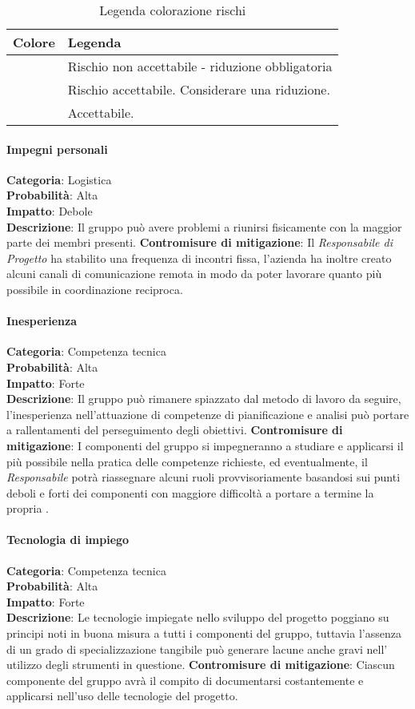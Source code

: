 \documentclass{scalatekids-article}
\begin{document}
\begin{table}[H]
  \centering
  \caption{Legenda colorazione rischi}
  \begin{tabular}{|c|l|}
    \hline \bf Colore & \bf Legenda \\
    \hline \cellcolor{red! 50} & Rischio non accettabile - riduzione obbligatoria \\
    \hline \cellcolor{yellow! 50} & Rischio accettabile. Considerare una riduzione. \\
    \hline \cellcolor{green! 50} & Accettabile. \\
    \hline
  \end{tabular}
\end{table}
\paragraph{Impegni personali}
\textbf{Categoria}: Logistica\\
\textbf{Probabilità}: Alta\\
\textbf{Impatto}: Debole\\
\textbf{Descrizione}: Il gruppo può avere problemi a riunirsi fisicamente con la maggior parte dei membri presenti.
\textbf{Contromisure di mitigazione}: Il \textit{Responsabile di Progetto} ha stabilito una frequenza di incontri fissa,
l'azienda ha inoltre creato alcuni canali di comunicazione remota in modo da poter lavorare quanto più possibile in
coordinazione reciproca.
\paragraph{Inesperienza}
\textbf{Categoria}: Competenza tecnica\\
\textbf{Probabilità}: Alta\\
\textbf{Impatto}: Forte\\
\textbf{Descrizione}: Il gruppo può rimanere spiazzato dal metodo di lavoro da seguire, l'inesperienza nell'attuazione
di competenze di pianificazione e analisi può portare a rallentamenti del perseguimento degli obiettivi.
\textbf{Contromisure di mitigazione}: I componenti del gruppo si impegneranno a studiare e applicarsi il più possibile
nella pratica delle competenze richieste, ed eventualmente, il \textit{Responsabile} potrà riassegnare alcuni ruoli provvisoriamente
basandosi sui punti deboli e forti dei componenti con maggiore difficoltà a portare a termine la propria .
\paragraph{Tecnologia di impiego}
\textbf{Categoria}: Competenza tecnica\\
\textbf{Probabilità}: Alta\\
\textbf{Impatto}: Forte\\
\textbf{Descrizione}: Le tecnologie impiegate nello sviluppo del progetto poggiano su principi noti in buona misura a tutti
i componenti del gruppo, tuttavia l'assenza di un grado di specializzazione tangibile può generare lacune anche gravi nell' utilizzo
degli strumenti in questione.
\textbf{Contromisure di mitigazione}: Ciascun componente del gruppo avrà il compito di documentarsi costantemente e applicarsi
nell'uso delle tecnologie del progetto.
\end{document}
